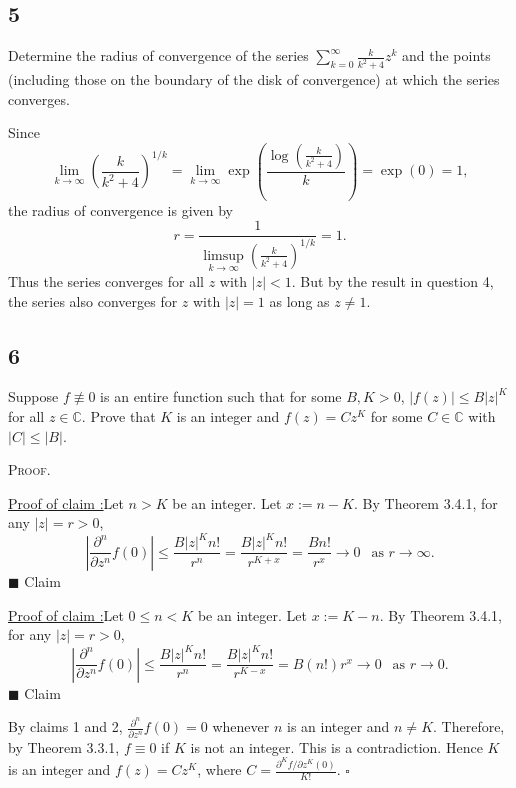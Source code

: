 \documentclass[12pt]{article}
\newcounter{ProofCounter}
\newcounter{ClaimCounter}[ProofCounter]
\newenvironment{Proof}{\stepcounter{ProofCounter}\textsc{Proof.}}{\hfill$\square$}
\newenvironment{claim}[1]{\vspace{1mm}\stepcounter{ClaimCounter}\par\noindent\underline{\bf Claim \theClaimCounter:}\space#1}{}
\newenvironment{claimproof}[1]{\par\noindent\underline{Proof of claim \theClaimCounter:}\space#1}{\hfill $\blacksquare$ Claim \theClaimCounter}
\begin{document}
\newpage 
\subsection*{5}
\begin{tcolorbox}
Determine the radius of convergence of the series $\sum_{k=0}^{\infty}\frac{k}{k^{2} + 4}z^{k}$ and the points (including those on the boundary of the
disk of convergence) at which the series converges.
\end{tcolorbox}
Since 
\[
\lim_{k\rightarrow\infty}\left( \frac{k}{k^{2} + 4} \right)^{1/k} = \lim_{k\rightarrow\infty}\exp \left( \frac{\log\left( \frac{k}{k^{2} + 4}
\right)}{k} \right) = \exp(0) = 1,
\]
the radius of convergence is given by 
\[ r = \frac{1}{\limsup_{k\rightarrow\infty}\left( \frac{k}{k^{2} + 4} \right)^{1/k}} = 1. \]
Thus the series converges for all $z$ with $|z| < 1$. But by the result in question 4, the series also converges for $z$ with $|z| = 1$ as long as $z
\neq 1$.


\newpage 
\subsection*{6} 
\begin{tcolorbox}
Suppose $f \not\equiv 0$ is an entire function such that for some $B, K > 0$, $|f(z)| \leq B|z|^{K}$ for all $z \in \mathbb{C}$. Prove that $K$ is an
integer and $f(z) = Cz^{K}$ for some $C \in \mathbb{C}$ with $|C| \leq |B|$.
\end{tcolorbox}
\begin{Proof}

\begin{claimproof}
Let $n > K$ be an integer. Let $x := n - K$. By Theorem 3.4.1, for any $|z| = r > 0$,
\[ \left| \frac{\partial^{n}}{\partial z^{n}}f(0)\right| \leq \frac{B|z|^{K}n!}{r^{n}} = \frac{B|z|^{K}n!}{r^{K+x}} = \frac{Bn!}{r^{x}} 
\rightarrow 0 \ \ \text{ as } r \rightarrow \infty. \]
\end{claimproof}
\begin{claimproof}
Let $0 \leq n < K$ be an integer. Let $x := K - n$. By Theorem 3.4.1, for any $|z| = r > 0$,
\[ \left| \frac{\partial^{n}}{\partial z^{n}}f(0)\right| \leq \frac{B|z|^{K}n!}{r^{n}} = \frac{B|z|^{K}n!}{r^{K-x}} = B(n!)r^{x} 
\rightarrow 0 \ \ \text{ as } r \rightarrow 0. \]
\end{claimproof}

By claims 1 and 2, $\frac{\partial^{n}}{\partial z^{n}}f(0) = 0$ whenever $n$ is an integer and $n \neq K$. Therefore, by Theorem 3.3.1, $f \equiv 0$
if $K$ is not an integer. This is a contradiction. Hence $K$ is an integer and 
$f(z) = Cz^{K}$, where $C = \frac{\partial^{K}f / \partial z^{K}(0)}{K!}$.
\end{Proof}
\end{document}
